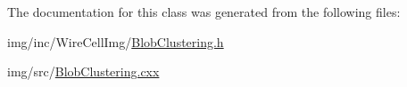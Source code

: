 The documentation for this class was generated from the following files\+:\begin{DoxyCompactItemize}
\item 
img/inc/\+Wire\+Cell\+Img/\hyperlink{_blob_clustering_8h}{Blob\+Clustering.\+h}\item 
img/src/\hyperlink{_blob_clustering_8cxx}{Blob\+Clustering.\+cxx}\end{DoxyCompactItemize}
